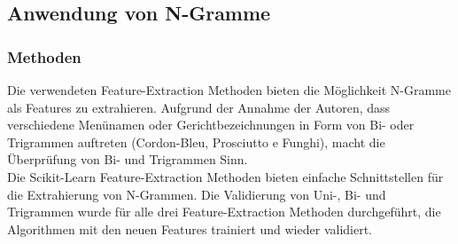 \subsection{Anwendung von N-Gramme}
\subsubsection{Methoden}
Die verwendeten Feature-Extraction Methoden bieten die Möglichkeit N-Gramme als Features zu extrahieren.
Aufgrund der Annahme der Autoren, dass verschiedene Menünamen oder Gerichtbezeichnungen in Form von Bi- oder Trigrammen auftreten (Cordon-Bleu, Prosciutto e Funghi), macht die Überprüfung von Bi- und Trigrammen Sinn.\\
Die Scikit-Learn Feature-Extraction Methoden bieten einfache Schnittstellen für die Extrahierung von N-Grammen.
Die Validierung von Uni-, Bi- und Trigrammen wurde für alle drei Feature-Extraction Methoden durchgeführt, die Algorithmen mit den neuen Features trainiert und wieder validiert.
